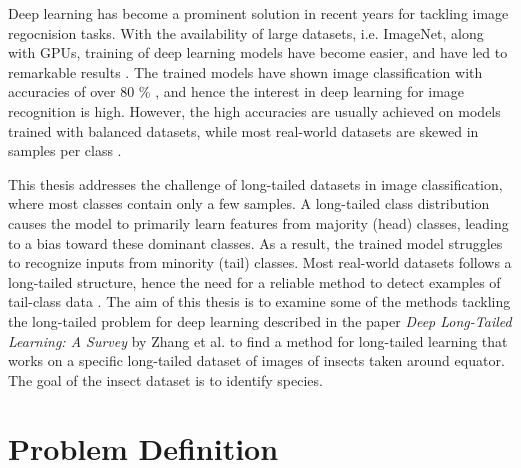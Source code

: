 \label{sec:introduction}

Deep learning has become a prominent solution in recent years for tackling image regocnision tasks. With the availability of large datasets, i.e. ImageNet, along with GPUs, training of deep learning models have become easier, and have led to remarkable results \cite{Goodfellow-et-al-2016}. The trained models have shown image classification with accuracies of over 80 \% \cite{he2015deepresiduallearningimage,dosovitskiy2021imageworth16x16words}, and hence the interest in deep learning for image recognition is high. However, the high accuracies are usually achieved on models trained with balanced datasets, while most real-world datasets are skewed in samples per class \cite{vanhorn2017deviltailsfinegrainedclassification,Buda_2018,liu2019largescalelongtailedrecognitionopen}.  

This thesis addresses the challenge of long-tailed datasets in image classification, where most classes contain only a few samples. A long-tailed class distribution causes the model to primarily learn features from majority (head) classes, leading to a bias toward these dominant classes. As a result, the trained model struggles to recognize inputs from minority (tail) classes. Most real-world datasets follows a long-tailed structure, hence the need for a reliable method to detect examples of tail-class data \cite{vanhorn2018inaturalistspeciesclassificationdetection,zhang2023deep}. The aim of this thesis is to examine some of the methods tackling the long-tailed problem for deep learning described in the paper \textit{Deep Long-Tailed Learning: A Survey} by Zhang et al.\cite{zhang2023deep} to find a method for long-tailed learning that works on a specific long-tailed dataset of images of insects taken around equator. The goal of the insect dataset is to identify species.

\section{Problem Definition}

